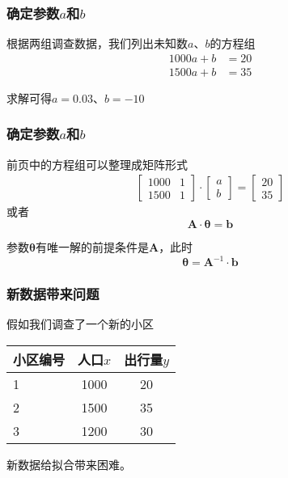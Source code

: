 \documentclass[14pt]{beamer}
\newcommand{\mat}[1]{\bm{#1}}
\renewcommand{\vec}[1]{\bm{#1}}
\let\emph\relax %
\begin{document}
\begin{frame}
    \frametitle{确定参数$a$和$b$}
    根据两组调查数据，我们列出未知数$a$、$b$的方程组
    \begin{align*}
        1000a+b&=20\\
        1500a+b&=35
    \end{align*}

    求解可得$a=0.03$、$b=-10$
\end{frame}

\begin{frame}
    \frametitle{确定参数$a$和$b$}
    前页中的方程组可以整理成矩阵形式
    \begin{align*}
        \begin{bmatrix}
            1000 & 1\\
            1500 & 1
        \end{bmatrix}\cdot
        \begin{bmatrix}
            a \\
            b
        \end{bmatrix}=
        \begin{bmatrix}
            20\\
            35
        \end{bmatrix}
    \end{align*}
    或者
    \[\mat{A}\cdot \vec{\theta}=\vec{b}\]

    参数$\vec{\theta}$有唯一解的前提条件是$\mat{A}$\emph{可逆}，此时
    \[ \vec{\theta}= \mat{A}^{-1}\cdot\vec{b}\]
\end{frame}

\begin{frame}
    \frametitle{新数据带来问题}
    假如我们调查了一个新的小区
    \begin{table}
        \begin{tabular}{l c c}
            小区编号 & 人口$x$ & 出行量$y$ \\
            \hline\hline
            1   & 1000  & 20 \\
            2   & 1500  & 35 \\
            \rowcolor{HRed} 3 & 1200 & 30      
        \end{tabular}
    \end{table}

    新数据给拟合带来困难。
\end{frame}
\end{document}
